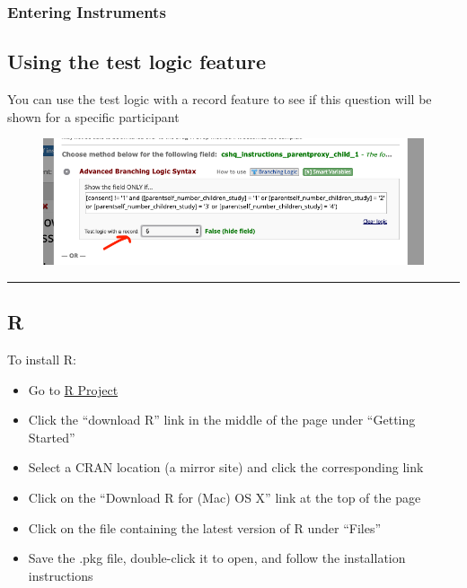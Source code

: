 \documentclass[]{book}
\providecommand{\tightlist}{%
  \setlength{\itemsep}{0pt}\setlength{\parskip}{0pt}}
\begin{document}
\subsubsection{Entering Instruments}\label{entering-instruments}

\subsection{Using the test logic
feature}\label{using-the-test-logic-feature}

You can use the test logic with a record feature to see if this question
will be shown for a specific participant

\begin{figure}
\centering
\includegraphics{images/lab_protocols/redcap/1.png}
\caption{}
\end{figure}

\begin{center}\rule{0.5\linewidth}{0.5pt}\end{center}

\subsection{R}\label{r}

To install R:

\begin{itemize}
\tightlist
\item
  Go to \href{http://www.r-project.org}{R Project}
\item
  Click the ``download R'' link in the middle of the page under
  ``Getting Started''
\item
  Select a CRAN location (a mirror site) and click the corresponding
  link
\item
  Click on the ``Download R for (Mac) OS X'' link at the top of the page
\item
  Click on the file containing the latest version of R under ``Files''
\item
  Save the .pkg file, double-click it to open, and follow the
  installation instructions
\end{itemize}
\end{document}
